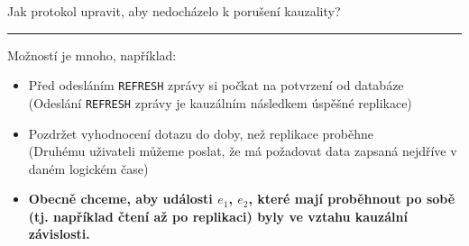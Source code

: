\documentclass[usenames,dvipsnames,9pt]{beamer}
\begin{document}
\begin{frame}
  \begin{center}
    \LARGE Jak protokol upravit, aby nedocházelo k porušení kauzality?
  \end{center}

  \pause\vspace{1em}\hrule\vspace{1em}
  Možností je mnoho, například:
  \begin{itemize}
    \pause\item Před odesláním \texttt{REFRESH} zprávy si počkat na potvrzení od databáze \\
                {\small (Odeslání \texttt{REFRESH} zprávy je kauzálním následkem úspěšné replikace)}
    \pause\item Pozdržet vyhodnocení dotazu do doby, než replikace proběhne \\
                {\small (Druhému uživateli můžeme poslat, že má požadovat data zapsaná nejdříve v daném logickém čase)}
  \end{itemize}
  \pause
  \begin{itemize}
    \item[\faWarning] \bf Obecně chceme, aby události $e_1$, $e_2$, které mají proběhnout po sobě (tj. například čtení až po replikaci) byly ve vztahu kauzální závislosti.
  \end{itemize}
\end{frame}



\end{document}
